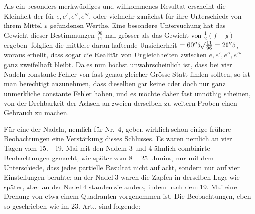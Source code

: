 
\par\clearpage
{}
Als ein besonders merkwürdiges und willkommenes Resultat erscheint die Kleinheit der für $e,e',e'',e'''$, oder vielmehr zunächst für ihre Unterschiede von ihrem Mittel $\varepsilon$ gefundenen Werthe. Eine besondere Untersuchung hat das Gewicht dieser Bestimmungen $\frac{96}{11}$ mal grösser als das Gewicht von $\tfrac12(f+g)$ ergeben, folglich die mittlere daran haftende Unsicherheit $=60''5\mathord{{}^{}\!\surd}\frac{11}{96}=20''5$, woraus erhellt, dass sogar die Realität von Ungleichheiten zwischen $e,e',e'',e'''$ ganz zweifelhaft bleibt. Da es nun höchst unwahrscheinlich ist, dass bei vier Nadeln constante Fehler von fast genau gleicher Grösse Statt finden sollten, so ist man berechtigt anzunehmen, dass dieselben gar keine oder doch nur ganz unmerkliche constante Fehler haben, und es möchte daher fast unnöthig scheinen, von der Drehbarkeit der Achsen an zweien derselben zu weitern Proben einen Gebrauch zu machen.

Für eine der Nadeln, nemlich für Nr.\ 4, geben wirklich schon einige frühere Beobachtungen eine Verstärkung dieses Schlusses. Es waren nemlich an vier Tagen vom 15.—19. Mai mit den Nadeln 3 und 4 ähnlich combinirte Beobachtungen gemacht, wie später vom 8.—25. Junius, nur mit dem Unterschiede, dass jedes partielle Resultat nicht auf acht, sondern nur auf vier Einstellungen beruhte; an der Nadel 3 waren die Zapfen in derselben Lage wie später, aber an der Nadel 4 standen sie anders, indem nach dem 19. Mai eine Drehung von etwa einem Quadranten vorgenommen ist. Die Beobachtungen, eben so geschrieben wie im 23. Art., sind folgende:

